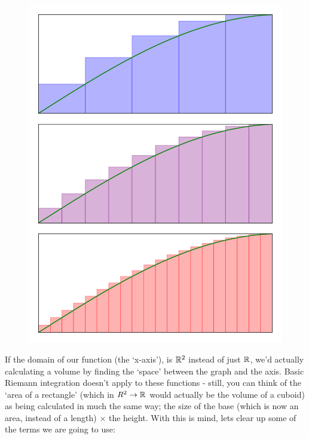 \begin{figure}[H]
\begin{minipage}{.5\textwidth}
  \includegraphics{Code/Area2.png}
  \label{fig:test1}
\end{minipage}
\end{figure}

If the domain of our function (the `x-axis'), is $\mathbb{R}^2$ instead of just $\mathbb{R}$, we'd actually calculating a volume by finding the `space' between the graph and the axis. Basic Riemann integration doesn't apply to these functions - still, you can think of the `area of a rectangle' (which in $R^2 \rightarrow \mathbb{R}$ would actually be the volume of a cuboid) as being calculated in much the same way; the size of the base (which is now an area, instead of a length) $\times$ the height. With this is mind, lets clear up some of the terms we are going to use:

